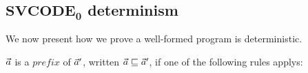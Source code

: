 %
%
%
%
%
%
%
%
%
%
%
%
%

\subsection{$\mathbf{SVCODE_0}$ determinism}

We now present  how we prove a well-formed \fmsvcode program is deterministic.\\

\begin{defi}
	$\vec a$ is a $prefix$ of $\vec a'$, written $\vec a \sqsubseteq \vec a'$, if one of the following rules applys: \\
	
	\emph{}
	\\
	
\end{defi}

